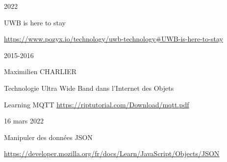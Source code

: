 \begin{thebibliography}{99}

    \bibitem[Pozyx]{}
    2022
    
    \newblock UWB is here to stay
    
    \url{https://www.pozyx.io/technology/uwb-technology#UWB-is-here-to-stay} 
    
    
    2015-2016
    
    \newblock Maximilien CHARLIER
    
    \newblock  Technologie Ultra Wide Band dans l’Internet des Objets
    
    
    \newblock Learning MQTT
    \url{https://riptutorial.com/Download/mqtt.pdf}
    
    
    16 mars 2022
    
    \newblock Manipuler des données JSON
    
    \url{https://developer.mozilla.org/fr/docs/Learn/JavaScript/Objects/JSON}
    
    \end{thebibliography}
    